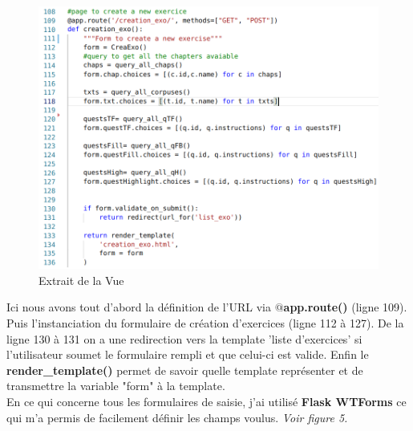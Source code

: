 \documentclass[12pt]{article}
\begin{document}
\begin{figure}[h]
    \centering
    \includegraphics[scale=0.3]{ex_views.png}
    \caption{Extrait de la Vue}
    \label{fig:ex_views}
\end{figure}

Ici nous avons tout d'abord la définition de l'URL via \textbf{$@$app.route()} (ligne 109). Puis l'instanciation du formulaire de création d'exercices (ligne 112 à 127). De la ligne 130 à 131 on a une redirection vers la template 'liste d'exercices' si l'utilisateur soumet le formulaire rempli et que celui-ci est valide. Enfin le \textbf{render\_template()} permet de savoir quelle template représenter et de transmettre la variable "form" à la template.   \\
En ce qui concerne tous les formulaires de saisie, j'ai utilisé \textbf{Flask WTForms} ce qui m'a permis de facilement définir  les champs voulus. \textit{Voir figure 5.}
\end{document}
